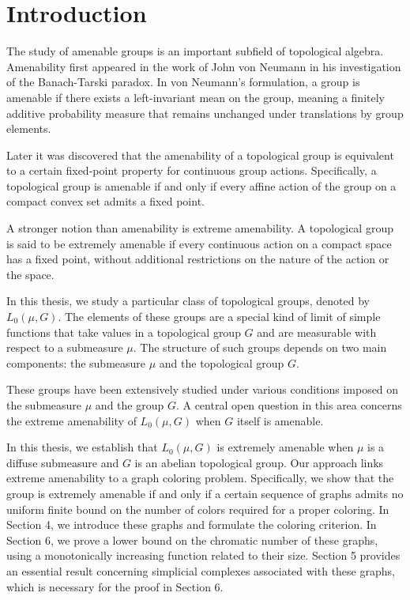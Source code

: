 \section{Introduction}
The study of amenable groups is an important subfield of topological algebra. Amenability first appeared in the work of John von Neumann \cite{vonNeumann1929} in his investigation of the Banach-Tarski paradox. In von Neumann’s formulation, a group is amenable if there exists a left-invariant mean on the group, meaning a finitely additive probability measure that remains unchanged under translations by group elements.

Later it was discovered that the amenability of a topological group is equivalent to a certain fixed-point property for continuous group actions. Specifically, a topological group is amenable if and only if every affine action of the group on a compact convex set admits a fixed point.

A stronger notion than amenability is extreme amenability. A topological group is said to be extremely amenable if every continuous action on a compact space has a fixed point, without additional restrictions on the nature of the action or the space.

In this thesis, we study a particular class of topological groups, denoted by $L_0(\mu, G)$. The elements of these groups are a special kind of limit of simple functions that take values in a topological group $G$ and are measurable with respect to a submeasure $\mu$. The structure of such groups depends on two main components: the submeasure $\mu$ and the topological group $G$.

These groups have been extensively studied under various conditions imposed on the submeasure $\mu$ and the group $G$. A central open question in this area concerns the extreme amenability of $L_0(\mu, G)$ when $G$ itself is amenable.

In this thesis, we establish that $L_0(\mu, G)$ is extremely amenable when $\mu$ is a diffuse submeasure and $G$ is an abelian topological group. Our approach links extreme amenability to a graph coloring problem. Specifically, we show that the group is extremely amenable if and only if a certain sequence of graphs admits no uniform finite bound on the number of colors required for a proper coloring. In Section 4, we introduce these graphs and formulate the coloring criterion. In Section 6, we prove a lower bound on the chromatic number of these graphs, using a monotonically increasing function related to their size. Section 5 provides an essential result concerning simplicial complexes associated with these graphs, which is necessary for the proof in Section 6.

